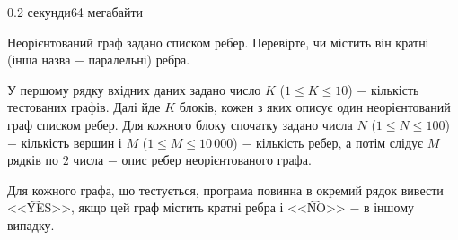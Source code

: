 \begin{problem}{}{}{}{0.2 секунди}{64 мегабайти}

Неорієнтований граф задано списком ребер. Перевірте, чи містить він кратні (інша назва $-$ паралельні) ребра.

\InputFile
У першому рядку вхідних даних задано число $K$ ($1 \le K \le 10$) $-$ кількість тестованих графів. 
Далі йде $K$ блоків, кожен з яких описує один неорієнтований граф списком ребер. 
Для кожного блоку спочатку задано числа $N$ ($1 \le N \le 100$) $-$ кількість вершин і $M$ ($1 \le M \le 10\,000$) $-$
кількість ребер, а потім слідує $M$ рядків по $2$ числа $-$ опис ребер неорієнтованого графа.

\OutputFile
Для кожного графа, що тестується, програма повинна в окремий рядок вивести <<{\t{YES}}>>, якщо цей граф
містить кратні ребра і <<{\t{NO}}>> $-$ в іншому випадку.

\Example

\begin{example}
%
\end{example}

\end{problem}

